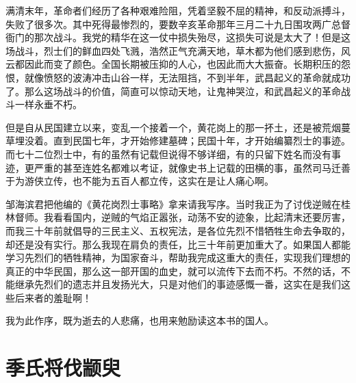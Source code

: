 \documentclass[12pt,UTF-8,openany,a4]{ctexbook}
\begin{document}
\begin{large}\yiwen
    
    满清末年，革命者们经历了各种艰难险阻，凭着坚毅不屈的精神，和反动派搏斗，失败了很多次。其中死得最惨烈的，要数辛亥革命那年三月二十九日围攻两广总督衙门的那次战斗。我党的精华在这一仗中损失殆尽，这损失可说是太大了！但是这场战斗，烈士们的鲜血四处飞溅，浩然正气充满天地，草木都为他们感到悲伤，风云都因此而变了颜色。全国长期被压抑的人心，也因此而大大振奋。长期积压的怨恨，就像愤怒的波涛冲击山谷一样，无法阻挡，不到半年，武昌起义的革命就成功了。那么这场战斗的价值，简直可以惊动天地，让鬼神哭泣，和武昌起义的革命战斗一样永垂不朽。
    
    但是自从民国建立以来，变乱一个接着一个，黄花岗上的那一抔土，还是被荒烟蔓草埋没着。直到民国七年，才开始修建墓碑；民国十年，才开始编纂烈士的事迹。而七十二位烈士中，有的虽然有记载但说得不够详细，有的只留下姓名而没有事迹，更严重的甚至连姓名都难以考证，就像史书上记载的田横的事，虽然司马迁善于为游侠立传，也不能为五百人都立传，这实在是让人痛心啊。
    
    邹海滨君把他编的《黄花岗烈士事略》拿来请我写序。当时我正为了讨伐逆贼在桂林督师。我看看国内，逆贼的气焰正嚣张，动荡不安的迹象，比起清末还要厉害，而我三十年前就倡导的三民主义、五权宪法，是各位先烈不惜牺牲生命去争取的，却还是没有实行。那么我现在肩负的责任，比三十年前更加重大了。如果国人都能学习先烈们的牺牲精神，为国家奋斗，帮助我完成这重大的责任，实现我们理想的真正的中华民国，那么这一部开国的血史，就可以流传下去而不朽。不然的话，不能继承先烈们的遗志并且发扬光大，只是对他们的事迹感慨一番，这实在是我们这些后来者的羞耻啊！
    
    我为此作序，既为逝去的人悲痛，也用来勉励读这本书的国人。
    

\end{large}



\chapter{季氏将伐颛臾}
\end{document}
